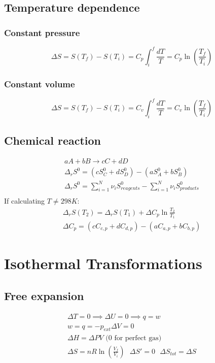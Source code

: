 \documentclass[a4paper]{report}
\begin{document}
\begin{multicols}{2}
    \subsection{Temperature dependence}
      \subsubsection{Constant pressure}
        \[
          \Delta S = S(T_{f}) - S(T_{i}) = C_{p}\int_{i}^{f} \frac{dT}{T} = C_{p}\ln \left( \frac{T_{f}}{T_{i} }  \right)  
        \] 
      \subsubsection{Constant volume} 
        \[
          \Delta S = S(T_{f}) - S(T_{i}) = C_{v}\int_{i}^{f} \frac{dT}{T} = C_{v}\ln \left( \frac{T_{f}}{T_{i} }  \right)  
        \] 
    \subsection{Chemical reaction}
    \begin{gather*}
      aA + bB \to cC + dD\\
      \Delta _{r}S^{0}  = (cS^{0} _{C} + dS^{0} _{D}) - (aS^{0} _{A} + bS^{0} _{B}  )\\
      \Delta _{r}  S^{0} = \sum_{i=1}^{N} \nu_{i}  S^{0} _{reagents} - \sum_{i=1}^{N} \nu_{i}  S^{0} _{products} \\
    \end{gather*}
    If calculating \( T \neq 298 K\):
    \begin{gather*}
      \Delta _{r}S (T_2) = \Delta _{r}S (T_1) + \Delta C_{p}\ln \frac{T_2}{T_1}\\
      \Delta C_{p} = (cC_{c,p} + dC_{d,p}) - (aC_{a,p} + bC_{b,p}) 
    \end{gather*}
      \section{Isothermal Transformations} 
        \subsection{Free expansion}
          \begin{gather*}
            \Delta T = 0 \implies \Delta U = 0 \implies q = w\\
            w = q = - p_{ext} \Delta V = 0\\
            \Delta H = \Delta PV \text{ (0 for perfect gas)}\\
            \Delta S = nR\ln (\frac{V_f}{V_i}) ~ ~ ~\Delta S' = 0 ~ ~ ~ \Delta S_{tot} = \Delta S
          \end{gather*}


\end{multicols}
\end{document}
